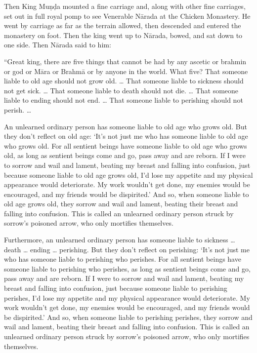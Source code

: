 \documentclass[12pt,openany]{book}%
\begin{document}
Then King \textsanskrit{Muṇḍa} mounted a fine carriage and, along with other fine carriages, set out in full royal pomp to see Venerable \textsanskrit{Nārada} at the Chicken Monastery. He went by carriage as far as the terrain allowed, then descended and entered the monastery on foot. Then the king went up to \textsanskrit{Nārada}, bowed, and sat down to one side. Then \textsanskrit{Nārada} said to him: 

“Great king, there are five things that cannot be had by any ascetic or brahmin or god or \textsanskrit{Māra} or \textsanskrit{Brahmā} or by anyone in the world. What five? That someone liable to old age should not grow old. … That someone liable to sickness should not get sick. … That someone liable to death should not die. … That someone liable to ending should not end. … That someone liable to perishing should not perish. … 

An unlearned ordinary person has someone liable to old age who grows old. But they don’t reflect on old age: ‘It’s not just me who has someone liable to old age who grows old. For all sentient beings have someone liable to old age who grows old, as long as sentient beings come and go, pass away and are reborn. If I were to sorrow and wail and lament, beating my breast and falling into confusion, just because someone liable to old age grows old, I’d lose my appetite and my physical appearance would deteriorate. My work wouldn’t get done, my enemies would be encouraged, and my friends would be dispirited.’ And so, when someone liable to old age grows old, they sorrow and wail and lament, beating their breast and falling into confusion. This is called an unlearned ordinary person struck by sorrow’s poisoned arrow, who only mortifies themselves. 

Furthermore, an unlearned ordinary person has someone liable to sickness … death … ending … perishing. But they don’t reflect on perishing: ‘It’s not just me who has someone liable to perishing who perishes. For all sentient beings have someone liable to perishing who perishes, as long as sentient beings come and go, pass away and are reborn. If I were to sorrow and wail and lament, beating my breast and falling into confusion, just because someone liable to perishing perishes, I’d lose my appetite and my physical appearance would deteriorate. My work wouldn’t get done, my enemies would be encouraged, and my friends would be dispirited.’ And so, when someone liable to perishing perishes, they sorrow and wail and lament, beating their breast and falling into confusion. This is called an unlearned ordinary person struck by sorrow’s poisoned arrow, who only mortifies themselves. 
\end{document}
